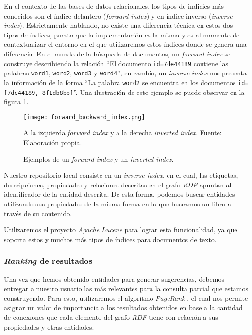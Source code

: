 En el contexto de las bases de datos relacionales, los tipos de indicies más conocidos son el índice delantero (\textit{forward index}) y en índice inverso (\textit{inverse index}). Estrictamente hablando, no existe una diferencia técnica en estos dos tipos de índices, puesto que la implementación es la misma y es al momento de contextualizar el entorno en el que utilizaremos estos índices donde se genera una diferencia. En el mundo de la búsqueda de documentos, un \textit{forward index} se construye describiendo la relación ``El documento \texttt{id=7de44189} contiene las palabras \texttt{word1}, \texttt{word2}, \texttt{word3} y \texttt{word4}'', en cambio, un \textit{inverse index} nos presenta la información de la forma ``La palabra \texttt{word2} se encuentra en los documentos \texttt{id=[7de44189, 8f1db8bb]}''. Una ilustración de este ejemplo se puede observar en la figura \ref{fig:forward-backward-index}.

\begin{figure}
    \centering
    \texttt{[image: forward\_backward\_index.png]}
    \caption{Ejemplos de un \textit{forward index} y un \textit{inverted
    index}.} A la izquierda \textit{forward index} y a la derecha
    \textit{inverted index}. Fuente: Elaboración propia.
    \label{fig:forward-backward-index}
\end{figure}

Nuestro repositorio local consiste en un \textit{inverse index}, en el cual, las etiquetas, descripciones, propiedades y relaciones descritas en el grafo \textit{RDF} apuntan al identificador de la entidad descrita. De esta forma, podemos buscar entidades utilizando sus propiedades de la misma forma en la que buscamos un libro a través de su contenido.

Utilizaremos el proyecto \textit{Apache Lucene} \cite{apache2012welcome} para lograr esta funcionalidad, ya que soporta estos y muchos más tipos de índices para documentos de texto.

\subsubsection{\textit{Ranking} de resultados}

Una vez que hemos obtenido entidades para generar sugerencias, debemos entregar a nuestro usuario las más relevantes para la consulta parcial que estamos construyendo. Para esto, utilizaremos el algoritmo \textit{PageRank} \cite{page1999pagerank}, el cual nos permite asignar un valor de importancia a los resultados obtenidos en base a la cantidad de conexiones que cada elemento del grafo \textit{RDF} tiene con relación a sus propiedades y otras entidades.

